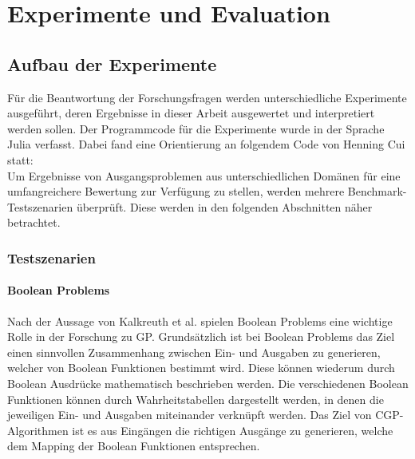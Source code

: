 \chapter{Experimente und Evaluation}
\label{praktischer Teil}

\section{Aufbau der Experimente}
\label{sec:aufbauExperimente}

Für die Beantwortung der Forschungsfragen werden unterschiedliche Experimente ausgeführt, deren Ergebnisse in dieser Arbeit ausgewertet und interpretiert werden sollen.
Der Programmcode für die Experimente wurde in der Sprache Julia verfasst.
Dabei fand eine Orientierung an folgendem Code von Henning Cui statt: \cite{cuihen_cuihencgp_with_crossover_strategies_2024}\\
Um Ergebnisse von Ausgangsproblemen aus unterschiedlichen Domänen für eine umfangreichere Bewertung zur Verfügung zu stellen, werden mehrere Benchmark-Testszenarien überprüft.
Diese werden in den folgenden Abschnitten näher betrachtet.

\subsection{Testszenarien}
\label{subsec:testszenarien}

\subsubsection{Boolean Problems}
\label{subsubsec:booleanProblems}

Nach der Aussage von Kalkreuth et al. spielen Boolean Problems eine wichtige Rolle in der Forschung zu GP.
Grundsätzlich ist bei Boolean Problems das Ziel einen sinnvollen Zusammenhang zwischen Ein- und Ausgaben zu generieren, welcher von Boolean Funktionen bestimmt wird.
Diese können wiederum durch Boolean Ausdrücke mathematisch beschrieben werden.
Die verschiedenen Boolean Funktionen können durch Wahrheitstabellen dargestellt werden, in denen die jeweiligen Ein- und Ausgaben miteinander verknüpft werden. \cite{kalkreuth_towards_2023}
Das Ziel von CGP-Algorithmen ist es aus Eingängen die richtigen Ausgänge zu generieren, welche dem Mapping der Boolean Funktionen entsprechen.\\


